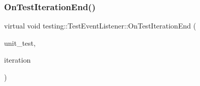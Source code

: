 \subsubsection{\texorpdfstring{OnTestIterationEnd()}{OnTestIterationEnd()}\hspace{0.1cm}{\footnotesize\ttfamily [1/3]}}
{\footnotesize\ttfamily virtual void testing\+::\+Test\+Event\+Listener\+::\+On\+Test\+Iteration\+End (\begin{DoxyParamCaption}\item[{const \mbox{\hyperlink{classtesting_1_1_unit_test}{Unit\+Test}} \&}]{unit\+\_\+test,  }\item[{int}]{iteration }\end{DoxyParamCaption})\hspace{0.3cm}{\ttfamily [pure virtual]}}




